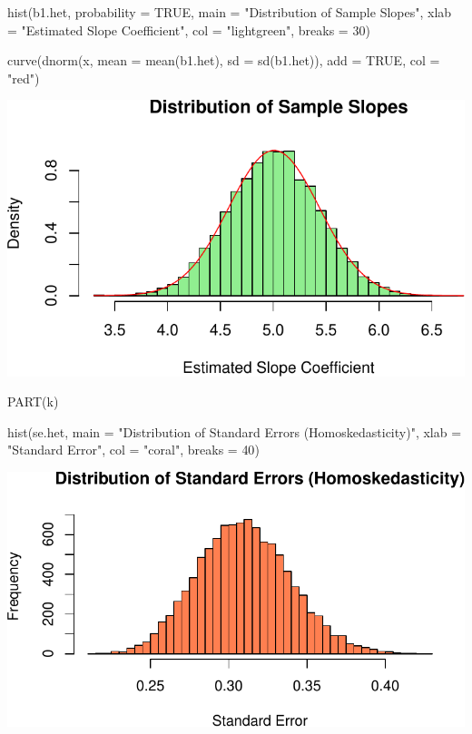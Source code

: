 \documentclass[
  11pt,
]{article}
\newenvironment{Shaded}{\begin{snugshade}}{\end{snugshade}}
\newcommand{\AttributeTok}[1]{\textcolor[rgb]{0.40,0.45,0.13}{#1}}
\newcommand{\ConstantTok}[1]{\textcolor[rgb]{0.56,0.35,0.01}{#1}}
\newcommand{\DecValTok}[1]{\textcolor[rgb]{0.68,0.00,0.00}{#1}}
\newcommand{\FunctionTok}[1]{\textcolor[rgb]{0.28,0.35,0.67}{#1}}
\newcommand{\NormalTok}[1]{\textcolor[rgb]{0.00,0.23,0.31}{#1}}
\newcommand{\StringTok}[1]{\textcolor[rgb]{0.13,0.47,0.30}{#1}}
\begin{document}
\begin{Shaded}
\begin{Highlighting}[]
\FunctionTok{hist}\NormalTok{(b1.het, }\AttributeTok{probability =} \ConstantTok{TRUE}\NormalTok{, }\AttributeTok{main =} \StringTok{"Distribution of Sample Slopes"}\NormalTok{, }
     \AttributeTok{xlab =} \StringTok{"Estimated Slope Coefficient"}\NormalTok{, }\AttributeTok{col =} \StringTok{"lightgreen"}\NormalTok{, }\AttributeTok{breaks =} \DecValTok{30}\NormalTok{)}

\FunctionTok{curve}\NormalTok{(}\FunctionTok{dnorm}\NormalTok{(x, }\AttributeTok{mean =} \FunctionTok{mean}\NormalTok{(b1.het), }\AttributeTok{sd =} \FunctionTok{sd}\NormalTok{(b1.het)), }\AttributeTok{add =} \ConstantTok{TRUE}\NormalTok{, }\AttributeTok{col =} \StringTok{"red"}\NormalTok{)}
\end{Highlighting}
\end{Shaded}

\includegraphics{HW-4-CODE-and-ANSWERS_files/figure-pdf/unnamed-chunk-19-1.pdf}

PART(k)

\begin{Shaded}
\begin{Highlighting}[]
\FunctionTok{hist}\NormalTok{(se.het, }
     \AttributeTok{main =} \StringTok{"Distribution of Standard Errors (Homoskedasticity)"}\NormalTok{, }
     \AttributeTok{xlab =} \StringTok{"Standard Error"}\NormalTok{, }\AttributeTok{col =} \StringTok{"coral"}\NormalTok{, }\AttributeTok{breaks =} \DecValTok{40}\NormalTok{)}
\end{Highlighting}
\end{Shaded}

\includegraphics{HW-4-CODE-and-ANSWERS_files/figure-pdf/unnamed-chunk-20-1.pdf}
\end{document}
